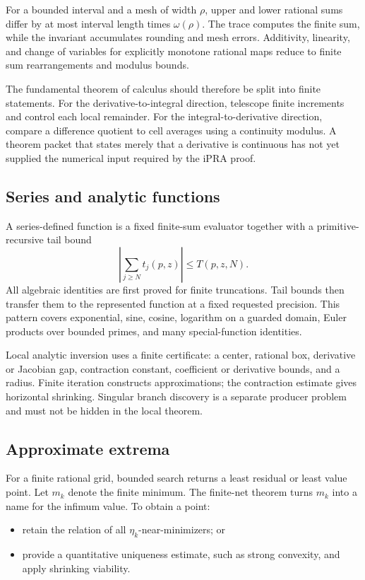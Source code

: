 For a bounded interval and a mesh of width \(\rho\), upper and lower rational
sums differ by at most interval length times \(\omega(\rho)\).  The trace
computes the finite sum, while the invariant accumulates rounding and mesh
errors.  Additivity, linearity, and change of variables for explicitly
monotone rational maps reduce to finite sum rearrangements and modulus bounds.

The fundamental theorem of calculus should therefore be split into finite
statements.  For the derivative-to-integral direction, telescope finite
increments and control each local remainder.  For the integral-to-derivative
direction, compare a difference quotient to cell averages using a continuity
modulus.  A theorem packet that states merely that a derivative is continuous
has not yet supplied the numerical input required by the iPRA proof.

\subsection{Series and analytic functions}

A series-defined function is a fixed finite-sum evaluator together with a
primitive-recursive tail bound
\[
 \left|\sum_{j\ge N}t_j(p,z)\right|\le T(p,z,N).
\]
All algebraic identities are first proved for finite truncations.  Tail bounds
then transfer them to the represented function at a fixed requested
precision.  This pattern covers exponential, sine, cosine, logarithm on a
guarded domain, Euler products over bounded primes, and many special-function
identities.

Local analytic inversion uses a finite certificate: a center, rational box,
derivative or Jacobian gap, contraction constant, coefficient or derivative
bounds, and a radius.  Finite iteration constructs approximations; the
contraction estimate gives horizontal shrinking.  Singular branch discovery
is a separate producer problem and must not be hidden in the local theorem.

\subsection{Approximate extrema}

For a finite rational grid, bounded search returns a least residual or least
value point.  Let \(m_k\) denote the finite minimum.  The finite-net theorem
turns \(m_k\) into a name for the infimum value.  To obtain a point:

\begin{itemize}
\item retain the relation of all \(\eta_k\)-near-minimizers; or
\item provide a quantitative uniqueness estimate, such as strong convexity,
      and apply shrinking viability.
\end{itemize}

